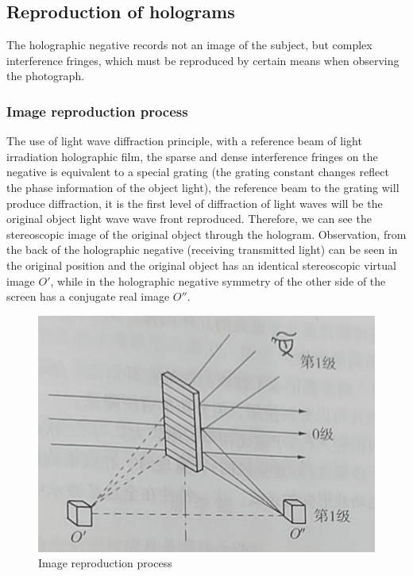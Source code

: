\documentclass[UTF8]{article}
\begin{document}
   \subsection{Reproduction of holograms}
   The holographic negative records not an image of the subject, but complex interference fringes, which must be reproduced by certain means when observing the photograph.
   
   \subsubsection{Image reproduction process}
   The use of light wave diffraction principle, with a reference beam of light irradiation holographic film, the sparse and dense interference fringes on the negative is equivalent to a special grating (the grating constant changes reflect the phase information of the object light), the reference beam to the grating will produce diffraction, it is the first level of diffraction of light waves will be the original object light wave wave front reproduced. Therefore, we can see the stereoscopic image of the original object through the hologram. Observation, from the back of the holographic negative (receiving transmitted light) can be seen in the original position and the original object has an identical stereoscopic virtual image $O'$, while in the holographic negative symmetry of the other side of the screen has a conjugate real image $O''$.
   
   	\begin{figure}[H]
       	    	\centering
       	    	\includegraphics[clip,scale=0.6,trim={0 0 0 0}]{fig/fig4.png}
       	        \caption{Image reproduction process}
       	        \label{figure.14}
           \end{figure}    
   
\end{document}
